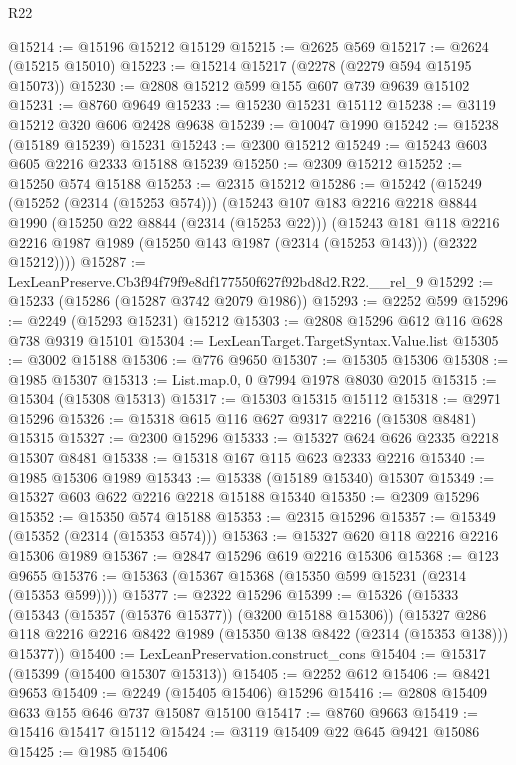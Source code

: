 \begin{lexlean}{R22}
\begin{coremodule}
@15214 := @15196 @15212 @15129
@15215 := @2625 @569
@15217 := @2624 (@15215 @15010)
@15223 := @15214 @15217 (@2278 (@2279 @594 @15195 @15073))
@15230 := @2808 @15212 @599 @155 @607 @739 @9639 @15102
@15231 := @8760 @9649
@15233 := @15230 @15231 @15112
@15238 := @3119 @15212 @320 @606 @2428 @9638
@15239 := @10047 @1990
@15242 := @15238 (@15189 @15239) @15231
@15243 := @2300 @15212
@15249 := @15243 @603 @605 @2216 @2333 @15188 @15239
@15250 := @2309 @15212
@15252 := @15250 @574 @15188
@15253 := @2315 @15212
@15286 := @15242
    (@15249
      (@15252 (@2314 (@15253 @574)))
      (@15243
        @107
        @183
        @2216
        @2218
        @8844
        @1990
        (@15250 @22 @8844 (@2314 (@15253 @22)))
        (@15243
          @181
          @118
          @2216
          @2216
          @1987
          @1989
          (@15250 @143 @1987 (@2314 (@15253 @143)))
          (@2322 @15212))))
@15287 := LexLeanPreserve.Cb3f94f79f9e8df177550f627f92bd8d2.R22.__rel_9
@15292 := @15233 (@15286 (@15287 @3742 @2079 @1986))
@15293 := @2252 @599
@15296 := @2249 (@15293 @15231) @15212
@15303 := @2808 @15296 @612 @116 @628 @738 @9319 @15101
@15304 := LexLeanTarget.TargetSyntax.Value.list
@15305 := @3002 @15188
@15306 := @776 @9650
@15307 := @15305 @15306
@15308 := @1985 @15307
@15313 := List.map.{0, 0} @7994 @1978 @8030 @2015
@15315 := @15304 (@15308 @15313)
@15317 := @15303 @15315 @15112
@15318 := @2971 @15296
@15326 := @15318 @615 @116 @627 @9317 @2216 (@15308 @8481) @15315
@15327 := @2300 @15296
@15333 := @15327 @624 @626 @2335 @2218 @15307 @8481
@15338 := @15318 @167 @115 @623 @2333 @2216
@15340 := @1985 @15306 @1989
@15343 := @15338 (@15189 @15340) @15307
@15349 := @15327 @603 @622 @2216 @2218 @15188 @15340
@15350 := @2309 @15296
@15352 := @15350 @574 @15188
@15353 := @2315 @15296
@15357 := @15349 (@15352 (@2314 (@15353 @574)))
@15363 := @15327 @620 @118 @2216 @2216 @15306 @1989
@15367 := @2847 @15296 @619 @2216 @15306
@15368 := @123 @9655
@15376 := @15363 (@15367 @15368 (@15350 @599 @15231 (@2314 (@15353 @599))))
@15377 := @2322 @15296
@15399 := @15326
    (@15333
      (@15343 (@15357 (@15376 @15377)) (@3200 @15188 @15306))
      (@15327 @286 @118 @2216 @2216 @8422 @1989 (@15350 @138 @8422 (@2314 (@15353 @138))) @15377))
@15400 := LexLeanPreservation.construct_cons
@15404 := @15317 (@15399 (@15400 @15307 @15313))
@15405 := @2252 @612
@15406 := @8421 @9653
@15409 := @2249 (@15405 @15406) @15296
@15416 := @2808 @15409 @633 @155 @646 @737 @15087 @15100
@15417 := @8760 @9663
@15419 := @15416 @15417 @15112
@15424 := @3119 @15409 @22 @645 @9421 @15086
@15425 := @1985 @15406

\end{coremodule}
\end{lexlean}

